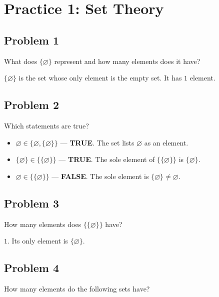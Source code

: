 
\section*{Practice 1: Set Theory}

\subsection*{Problem 1}
What does $\{\varnothing\}$ represent and how many elements does it have?

$\{\varnothing\}$ is the set whose only element is the empty set. It has $\boxed{1}$ element.

\subsection*{Problem 2}
Which statements are true?

\begin{itemize}
  \item[2.1.] $\varnothing \in \{\varnothing, \{\varnothing\}\}$ --- \textbf{TRUE}. The set lists $\varnothing$ as an element.
  \item[2.2.] $\{\varnothing\} \in \{\{\varnothing\}\}$ --- \textbf{TRUE}. The sole element of $\{\{\varnothing\}\}$ is $\{\varnothing\}$.
  \item[2.3.] $\varnothing \in \{\{\varnothing\}\}$ --- \textbf{FALSE}. The sole element is $\{\varnothing\} \neq \varnothing$.
\end{itemize}

\subsection*{Problem 3}
How many elements does $\{\{\varnothing\}\}$ have?

$\boxed{1}$. Its only element is $\{\varnothing\}$.

\subsection*{Problem 4}
How many elements do the following sets have?

